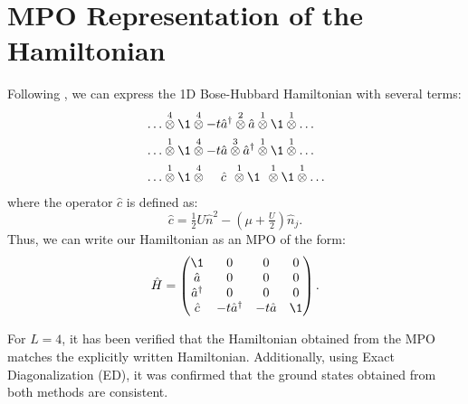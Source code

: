 \section{MPO Representation of the Hamiltonian}

Following \cite{catarina_density-matrix_2023}, we can express the 1D Bose-Hubbard Hamiltonian with several terms:
\begin{align*}
	&\ldots \overset{4}{\otimes} \1 \overset{4}{\otimes} - t \hat{a}^\dagger \overset{2}{\otimes} \hat{a} \overset{1}{\otimes} \1 \overset{1}{\otimes} \ldots \\
	&\ldots \overset{1}{\otimes} \1 \overset{4}{\otimes} -t \hat{a} \overset{3}{\otimes} \hat{a}^\dagger \overset{1}{\otimes} \1 \overset{1}{\otimes} \ldots \\
	&\ldots \overset{1}{\otimes} \1 \overset{4}{\otimes} \phantom{-t} \hat{c} \phantom{\D} \overset{1}{\otimes} \1 \phantom{\D} \overset{1}{\otimes} \1 \overset{1}{\otimes} \ldots
\end{align*}
where the operator $\hat{c}$ is defined as:
\begin{equation*}
	\hat{c} = \tfrac{1}{2}U \hat{n}^2 - \left(\mu + \tfrac{U}{2}\right) \hat{n}_j.
\end{equation*}
Thus, we can write our Hamiltonian as an MPO of the form:
\begin{equation*}
	\hat{H} = \begin{pmatrix}
		\1 & 0 & 0 & 0 \\
		\hat{a} & 0 & 0 & 0 \\
		\hat{a}^\dagger & 0 & 0 & 0 \\
		\hat{c} & -t \hat{a}^\dagger & -t \hat{a} & \1 \\
	\end{pmatrix}.
\end{equation*}

For $L=4$, it has been verified that the Hamiltonian obtained from the MPO matches the explicitly written Hamiltonian. Additionally, using Exact Diagonalization (ED), it was confirmed that the ground states obtained from both methods are consistent.



